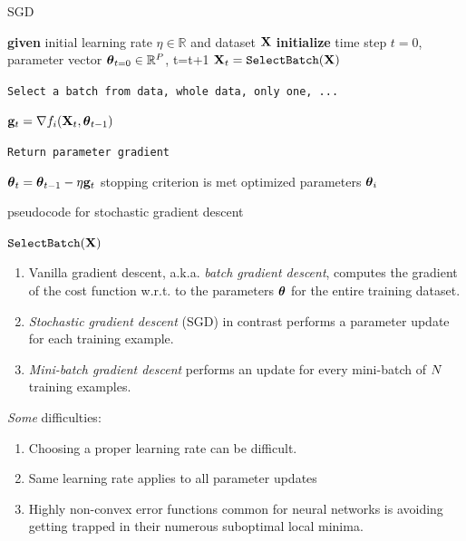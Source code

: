 \documentclass[xcolor=pdftex,dvipsnames,table,mathserif]{beamer}
\begin{document}
\begin{frame}{SGD \cite{robbins1985stochastic}}
\begin{algorithm}[H]
\begin{algorithmic}[1]
\STATE \textbf{given} initial learning rate $\eta \in \mathbb{R}$ and dataset $\mathbf{X}$
\STATE \textbf{initialize} time step $t=0$, parameter vector $\boldsymbol{\theta}_{t=0} \in \mathbb{R}^P$,
\REPEAT
\STATE t=t+1
\STATE $\mathbf{X}_t=\texttt{SelectBatch} (\mathbf{X})$ \begin{tiny}\texttt{Select a batch from data, whole data, only one, ... } \end{tiny}
\STATE $\mathbf{g}_t = \nabla f_i(\mathbf{X}_t,\boldsymbol{\theta}_{t-1})$  \begin{tiny}\texttt{Return parameter gradient}\end{tiny}
\STATE $\boldsymbol{\theta}_t=\boldsymbol{\theta}_{t-1}  - \eta \mathbf{g}_t$
\UNTIL stopping criterion is met
\RETURN optimized parameters $\boldsymbol{\theta}_i$
\end{algorithmic}
\caption{pseudocode for stochastic gradient descent }
\label{alg:seq}
\end{algorithm}
\end{frame}


\begin{frame}{$\texttt{SelectBatch} (\mathbf{X})$}
\begin{enumerate}
\item Vanilla gradient descent, a.k.a. \emph{batch gradient descent}, computes the gradient of the cost function w.r.t. to the parameters $\boldsymbol{\theta}$
for the entire training dataset.
\item \emph{Stochastic gradient descent} (SGD) in contrast performs a parameter update for each training example. 
\item \emph{Mini-batch gradient descent} performs an update for every mini-batch of $N$ training examples.
\end{enumerate}
\textit{Some} difficulties:
\begin{enumerate}
\item Choosing a proper learning rate can be difficult.
\item Same learning rate applies to all parameter updates
\item Highly non-convex error functions common for neural networks is avoiding getting trapped in their numerous suboptimal local minima.
\end{enumerate}
\end{frame}
\end{document}
